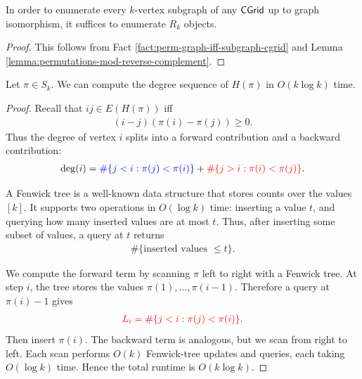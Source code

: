 \begin{fact}
In order to enumerate every $k$-vertex subgraph of any $\mathsf{CGrid}$ up to graph isomorphism, it suffices to enumerate $R_k$ objects.
\end{fact}

\begin{proof}
This follows from Fact \ref{fact:perm-graph-iff-subgraph-cgrid} and Lemma \ref{lemma:permutations-mod-reverse-complement}.
\end{proof}

\begin{lemma}
Let \(\pi\in S_k\). We can compute the degree sequence of \(H(\pi)\) in
\(O(k\log k)\) time.
\end{lemma}

\begin{proof}
Recall that \(ij\in E(H(\pi))\) iff
\begin{align}
    (i-j)(\pi(i)-\pi(j))\geq 0.
\end{align}
Thus the degree of vertex \(i\) splits into a {\color{red}forward contribution} and a {\color{blue}backward contribution}:
\begin{align}
    \deg(i)
    =
    {\color{blue}\#\{j<i:\pi(j)<\pi(i)\}}
    +
    {\color{red}\#\{j>i:\pi(i)<\pi(j)\}}.
\end{align}

A Fenwick tree is a well-known data structure that stores counts over the values
\([k]\). It supports two operations in \(O(\log k)\) time: inserting a value
\(t\), and querying how many inserted values are at most \(t\). Thus, after
inserting some subset of values, a query at \(t\) returns
\begin{align}
    \#\{\text{inserted values } \leq t\}.
\end{align}

We compute the {\color{red}forward term} by scanning \(\pi\) left to right
with a Fenwick tree. At step \(i\), the tree stores the values
\(\pi(1),\dots,\pi(i-1)\). Therefore a query at \(\pi(i)-1\) gives
\begin{align}
    {\color{red}
    L_i=\#\{j<i:\pi(j)<\pi(i)\}}.
\end{align}
Then insert \(\pi(i)\). The {\color{blue}backward term} is analogous, but we scan from right to left. Each scan performs \(O(k)\) Fenwick-tree updates and queries, each taking \(O(\log k)\) time. Hence the total runtime is \(O(k\log k)\).
\end{proof}

